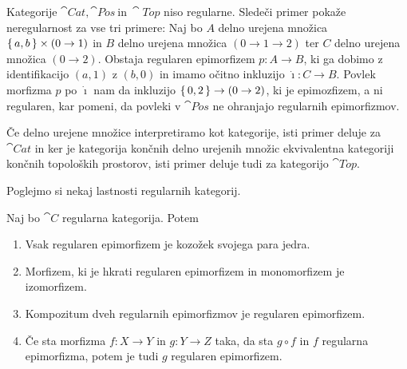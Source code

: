 \documentclass[../kategoricna_logika.tex]{subfiles}
\begin{document}
\begin{primer}
  Kategorije $\cat{Cat}, \cat{Pos}\ \text{in}\ \cat{Top}$ niso regularne.
  Sledeči primer pokaže neregularnost za vse tri primere:
  Naj bo $A$ delno urejena množica $\left\lbrace\,a, b\,\right\rbrace \times (0 \to 1)$ in $B$ delno urejena množica
  $(0 \to 1 \to 2)$ ter $C$ delno urejena množica $(0 \to 2)$.
  Obstaja regularen epimorfizem $p : A \to B$, ki ga dobimo z identifikacijo $(a,1)$ z $(b, 0)$
  in imamo očitno inkluzijo $\dot{\imath} : C \to B$. Povlek morfizma $p$ po $\dot{\imath}$ nam da inkluzijo
  $\left\lbrace\,0, 2\,\right\rbrace \to (0 \to 2)$, ki je epimozfizem, a ni regularen, kar pomeni,
  da povleki v $\cat{Pos}$ ne ohranjajo regularnih epimorfizmov.

  Če delno urejene množice interpretiramo kot kategorije, isti primer deluje za $\cat{Cat}$
  in ker je kategorija končnih delno urejenih množic ekvivalentna kategoriji končnih topoloških prostorov,
  isti primer deluje tudi za kategorijo $\cat{Top}$.
\end{primer}
Poglejmo si nekaj lastnosti regularnih kategorij.
\begin{lema}\label{lema:lastnosti-regularnih-epimorfizmov}
    Naj bo $\cat{C}$ regularna kategorija. Potem
    \begin{enumerate}[label=(\roman*), nosep]
        \item Vsak regularen epimorfizem je kozožek svojega para jedra.
        \item Morfizem, ki je hkrati regularen epimorfizem in monomorfizem je izo\-morfizem.
        \item Kompozitum dveh regularnih epimorfizmov je regularen epimorfizem.
        \item Če sta morfizma $f : X \to Y$ in $g : Y \to Z$ taka,
          da sta $g \circ f$ in $f$ regularna epimorfizma, potem je tudi $g$ regularen epimorfizem.
    \end{enumerate}
\end{lema}
\noindent
\end{document}
